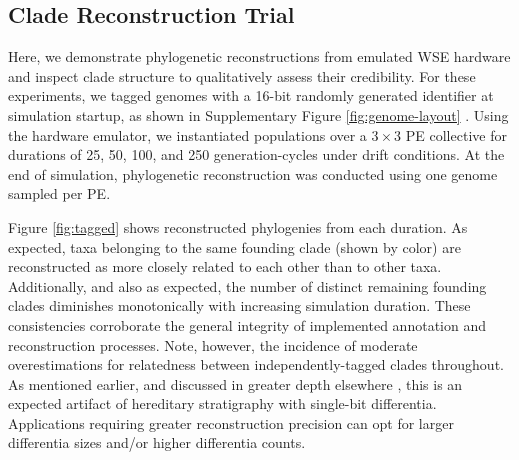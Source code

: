 \subsection{Clade Reconstruction Trial}


Here, we demonstrate phylogenetic reconstructions from emulated WSE hardware and inspect clade structure to qualitatively assess their credibility.
For these experiments, we tagged genomes with a 16-bit randomly generated identifier at simulation startup, as shown in Supplementary Figure \ref{fig:genome-layout} \citep{moreno2024supplement}.
Using the hardware emulator, we instantiated populations over a $3\times3$ PE collective for durations of 25, 50, 100, and 250 generation-cycles under drift conditions.
At the end of simulation, phylogenetic reconstruction was conducted using one genome sampled per PE.



Figure \ref{fig:tagged} shows reconstructed phylogenies from each duration.
As expected, taxa belonging to the same founding clade (shown by color) are reconstructed as more closely related to each other than to other taxa.
Additionally, and also as expected, the number of distinct remaining founding clades diminishes monotonically with increasing simulation duration.
These consistencies corroborate the general integrity of implemented annotation and reconstruction processes.
Note, however, the incidence of moderate overestimations for relatedness between independently-tagged clades throughout.
As mentioned earlier, and discussed in greater depth elsewhere \citep{moreno2024guide}, this is an expected artifact of hereditary stratigraphy with single-bit differentia.
Applications requiring greater reconstruction precision can opt for larger differentia sizes and/or higher differentia counts.


